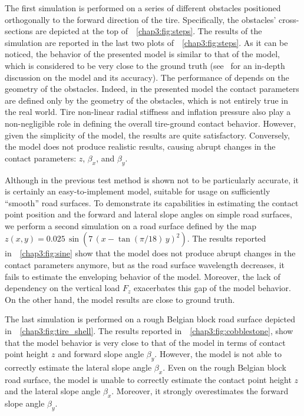 The first simulation is performed on a series of different obstacles positioned orthogonally to the forward direction of the tire. Specifically, the obstacles' cross-sections are depicted at the top of~\figurename{}~\ref{chap3:fig:steps}. The results of the simulation are reported in the last two plots of~\figurename{}~\ref{chap3:fig:steps}. As it can be noticed, the behavior of the presented model is similar to that of the \Swift{} model, which is considered to be very close to the ground truth (see~\cite{schmeitz2004semiempirical} for an in-depth discussion on the \Swift{} model and its accuracy). The performance of \Enve{} depends on the geometry of the obstacles. Indeed, in the presented model the contact parameters are defined only by the geometry of the obstacles, which is not entirely true in the real world. Tire non-linear radial stiffness and inflation pressure also play a non-negligible role in defining the overall tire-ground contact behavior. However, given the simplicity of the model, the results are quite satisfactory. Conversely, the \TMEasy{} model does not produce realistic results, causing abrupt changes in the contact parameters: $z$, $\beta_x$, and $\beta_y$.

Although in the previous test \TMEasy{} method is shown not to be particularly accurate, it is certainly an easy-to-implement model, suitable for usage on sufficiently ``smooth'' road surfaces. To demonstrate its capabilities in estimating the contact point position and the forward and lateral slope angles on simple road surfaces, we perform a second simulation on a road surface defined by the map $z(x,y) =  0.025\,\sin(7\,(x-\tan(\pi/18)\,y)^2)$. The results reported in~\figurename{}~\ref{chap3:fig:sine} show that the \TMEasy{} model does not produce abrupt changes in the contact parameters anymore, but as the road surface wavelength decreases, it fails to estimate the enveloping behavior of the \Swift{} model. Moreover, the lack of dependency on the vertical load $F_z$ exacerbates this gap of the \TMEasy{} model behavior. On the other hand, the \Enve{} model results are close to ground truth.

The last simulation is performed on a rough Belgian block road surface depicted in~\figurename{}~\ref{chap3:fig:tire_shell}. The results reported in~\figurename{}~\ref{chap3:fig:cobblestone}, show that the \Enve{} model behavior is very close to that of the \Swift{} model in terms of contact point height $z$ and forward slope angle $\beta_y$. However, the \Enve{} model is not able to correctly estimate the lateral slope angle $\beta_x$. Even on the rough Belgian block road surface, the \TMEasy{} model is unable to correctly estimate the contact point height $z$ and the lateral slope angle $\beta_x$. Moreover, it strongly overestimates the forward slope angle $\beta_y$.

